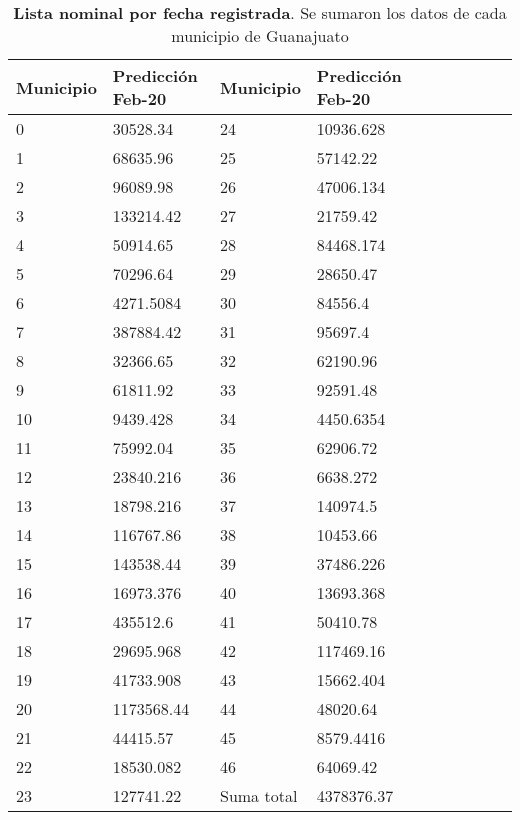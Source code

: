 \documentclass{article}
\begin{document}
\begin{table}[htb!]\centering
\begin{tabular}{|l|l|l|l|l|l|l|l|l|l|}
\hline
Municipio & Predicción Feb-20 & Municipio & Predicción Feb-20 \\ \hline
0 & 30528.34 & 24 & 10936.628 \\ \hline
1 & 68635.96 & 25 & 57142.22 \\ \hline
2 & 96089.98 & 26 & 47006.134\\ \hline
3 & 133214.42 & 27 & 21759.42\\ \hline
4 & 50914.65 & 28 & 84468.174\\ \hline
5 & 70296.64 & 29 & 28650.47\\ \hline
6 & 4271.5084 & 30 & 84556.4\\ \hline
7 & 387884.42 & 31 & 95697.4\\ \hline
8 & 32366.65 & 32 & 62190.96\\ \hline
9 & 61811.92 & 33 & 92591.48\\ \hline
10 & 9439.428 & 34 & 4450.6354\\ \hline
11 & 75992.04 & 35 & 62906.72\\ \hline
12 & 23840.216 & 36 & 6638.272\\ \hline
13 & 18798.216 & 37 & 140974.5\\ \hline
14 & 116767.86 & 38 & 10453.66\\ \hline
15 & 143538.44 & 39 & 37486.226\\ \hline
16 & 16973.376 & 40 & 13693.368\\ \hline
17 & 435512.6 & 41 & 50410.78\\ \hline
18 & 29695.968 & 42 & 117469.16\\ \hline
19 & 41733.908 & 43 & 15662.404\\ \hline
20 & 1173568.44 & 44 & 48020.64\\ \hline
21 & 44415.57 & 45 & 8579.4416\\ \hline
22 & 18530.082 & 46 & 64069.42\\ \hline
23 & 127741.22 & Suma total & 4378376.37\\ \hline
\end{tabular}
\caption{\textbf{Lista nominal por fecha registrada}. Se sumaron los datos de cada municipio de Guanajuato}
\label{table:V1}
\end{table}
\end{document}
